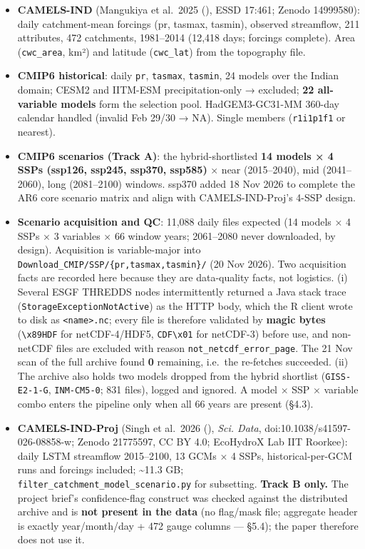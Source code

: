\documentclass[
  english,
  11pt,
]{article}
\providecommand{\tightlist}{%
  \setlength{\itemsep}{0pt}\setlength{\parskip}{0pt}}
\begin{document}
\begin{itemize}
\tightlist
\item
  \textbf{CAMELS-IND} (Mangukiya et al.~2025
  (), ESSD
  17:461; Zenodo 14999580): daily catchment-mean forcings (pr, tasmax,
  tasmin), observed streamflow, 211 attributes, 472 catchments,
  1981--2014 (12,418 days; forcings complete). Area (\texttt{cwc\_area},
  km²) and latitude (\texttt{cwc\_lat}) from the topography file.
\item
  \textbf{CMIP6 historical}: daily \texttt{pr}, \texttt{tasmax},
  \texttt{tasmin}, 24 models over the Indian domain; CESM2 and IITM-ESM
  precipitation-only → excluded; \textbf{22 all-variable models} form
  the selection pool. HadGEM3-GC31-MM 360-day calendar handled (invalid
  Feb 29/30 → NA). Single members (\texttt{r1i1p1f1} or nearest).
\item
  \textbf{CMIP6 scenarios (Track A)}: the hybrid-shortlisted \textbf{14
  models × 4 SSPs (ssp126, ssp245, ssp370, ssp585)} × near (2015--2040),
  mid (2041--2060), long (2081--2100) windows. ssp370 added 18 Nov 2026
  to complete the AR6 core scenario matrix and align with
  CAMELS-IND-Proj's 4-SSP design.
\item
  \textbf{Scenario acquisition and QC}: 11,088 daily files expected (14
  models × 4 SSPs × 3 variables × 66 window years; 2061--2080 never
  downloaded, by design). Acquisition is variable-major into
  \texttt{Download\_CMIP/SSP/\{pr,tasmax,tasmin\}/} (20 Nov 2026). Two
  acquisition facts are recorded here because they are data-quality
  facts, not logistics. (i) Several ESGF THREDDS nodes intermittently
  returned a Java stack trace (\texttt{StorageExceptionNotActive}) as
  the HTTP body, which the R client wrote to disk as
  \texttt{\textless{}name\textgreater{}.nc}; every file is therefore
  validated by \textbf{magic bytes} (\texttt{\textbackslash{}x89HDF} for
  netCDF-4/HDF5, \texttt{CDF\textbackslash{}x01} for netCDF-3) before
  use, and non-netCDF files are excluded with reason
  \texttt{not\_netcdf\_error\_page}. The 21 Nov scan of the full archive
  found \textbf{0} remaining, i.e.~the re-fetches succeeded. (ii) The
  archive also holds two models dropped from the hybrid shortlist
  (\texttt{GISS-E2-1-G}, \texttt{INM-CM5-0}; 831 files), logged and
  ignored. A model × SSP × variable combo enters the pipeline only when
  all 66 years are present (§4.3).
\item
  \textbf{CAMELS-IND-Proj} (Singh et al.~2026
  (), \emph{Sci.
  Data}, doi:10.1038/s41597-026-08858-w; Zenodo 21775597, CC BY 4.0;
  EcoHydroX Lab IIT Roorkee): daily LSTM streamflow 2015--2100, 13 GCMs
  × 4 SSPs, historical-per-GCM runs and forcings included;
  \textasciitilde11.3 GB; \texttt{filter\_catchment\_model\_scenario.py}
  for subsetting. \textbf{Track B only.} The project brief's
  confidence-flag construct was checked against the distributed archive
  and is \textbf{not present in the data} (no flag/mask file; aggregate
  header is exactly year/month/day + 472 gauge columns --- §5.4); the
  paper therefore does not use it.
\end{itemize}
\end{document}
